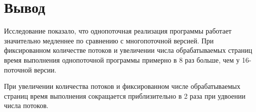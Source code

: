 \clearpage


\section{Вывод}
Исследование показало, что однопоточная реализация программы работает значительно медленнее по сравнению с многопоточной версией. При фиксированном количестве потоков и увеличении числа обрабатываемых страниц время выполнения однопоточной программы примерно в 8 раз больше, чем у 16-поточной версии.

При увеличении количества потоков и фиксированном числе обрабатываемых страниц время выполнения сокращается приблизительно в 2 раза при удвоении числа потоков.
